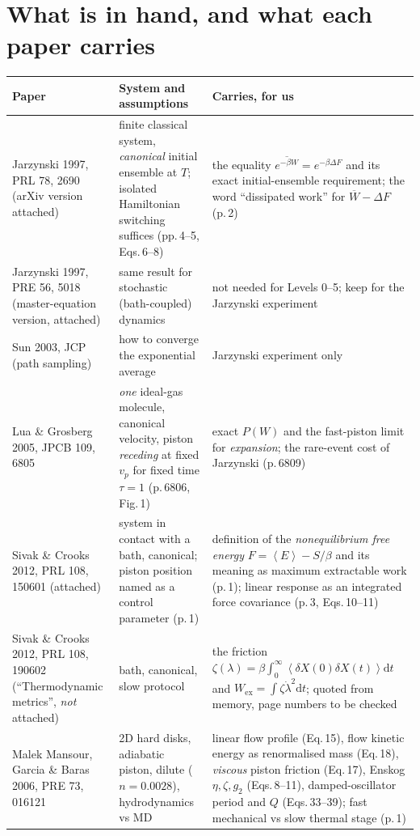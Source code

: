 \documentclass[11pt,a4paper]{article}
\newcommand{\avg}[1]{\left\langle #1 \right\rangle}
\newcommand{\dd}{\mathrm{d}}
\begin{document}
\section{What is in hand, and what each paper carries}
\begin{center}
\footnotesize
\begin{tabular}{@{}p{4.6cm}p{5.2cm}p{5.6cm}@{}}
\toprule
Paper & System and assumptions & Carries, for us \\
\midrule
Jarzynski 1997, PRL 78, 2690 (arXiv version attached) & finite classical system, \emph{canonical} initial ensemble at $T$; isolated Hamiltonian switching suffices (pp.\,4--5, Eqs.\,6--8) & the equality $\overline{e^{-\beta W}} = e^{-\beta\Delta F}$ and its exact initial-ensemble requirement; the word ``dissipated work'' for $\overline W - \Delta F$ (p.\,2) \\
Jarzynski 1997, PRE 56, 5018 (master-equation version, attached) & same result for stochastic (bath-coupled) dynamics & not needed for Levels 0--5; keep for the Jarzynski experiment \\
Sun 2003, JCP (path sampling) & how to converge the exponential average & Jarzynski experiment only \\
Lua \& Grosberg 2005, JPCB 109, 6805 & \emph{one} ideal-gas molecule, canonical velocity, piston \emph{receding} at fixed $v_p$ for fixed time $\tau = 1$ (p.\,6806, Fig.\,1) & exact $P(W)$ and the fast-piston limit for \emph{expansion}; the rare-event cost of Jarzynski (p.\,6809) \\
Sivak \& Crooks 2012, PRL 108, 150601 (attached) & system in contact with a bath, canonical; piston position named as a control parameter (p.\,1) & definition of the \emph{nonequilibrium free energy} $F = \avg E - S/\beta$ and its meaning as maximum extractable work (p.\,1); linear response as an integrated force covariance (p.\,3, Eqs.\,10--11) \\
Sivak \& Crooks 2012, PRL 108, 190602 (``Thermodynamic metrics'', \emph{not} attached) & bath, canonical, slow protocol & the friction $\zeta(\lambda) = \beta\int_0^\infty \avg{\delta X(0)\delta X(t)}\dd t$ and $W_{\mathrm{ex}} = \int \zeta \dot\lambda^2 \dd t$; quoted from memory, page numbers to be checked \\
Malek Mansour, Garcia \& Baras 2006, PRE 73, 016121 & 2D hard disks, adiabatic piston, dilute ($n = 0.0028$), hydrodynamics vs MD & linear flow profile (Eq.\,15), flow kinetic energy as renormalised mass (Eq.\,18), \emph{viscous} piston friction (Eq.\,17), Enskog $\eta,\zeta,g_2$ (Eqs.\,8--11), damped-oscillator period and $Q$ (Eqs.\,33--39); fast mechanical vs slow thermal stage (p.\,1) \\

\end{tabular}
\end{center}
\end{document}
